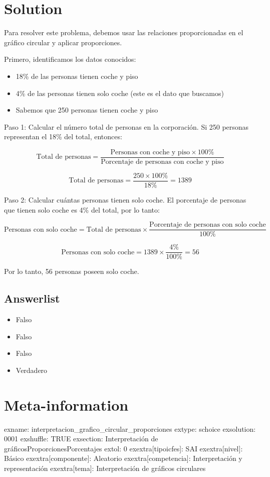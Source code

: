 \documentclass[
]{article}
\providecommand{\tightlist}{%
  \setlength{\itemsep}{0pt}\setlength{\parskip}{0pt}}
\begin{document}
\section{Solution}\label{solution}

Para resolver este problema, debemos usar las relaciones proporcionadas
en el gráfico circular y aplicar proporciones.

Primero, identificamos los datos conocidos:

\begin{itemize}
\tightlist
\item
  18\% de las personas tienen coche y piso
\item
  4\% de las personas tienen solo coche (este es el dato que buscamos)
\item
  Sabemos que 250 personas tienen coche y piso
\end{itemize}

Paso 1: Calcular el número total de personas en la corporación. Si 250
personas representan el 18\% del total, entonces:

\[\text{Total de personas} = \frac{\text{Personas con coche y piso} \times 100\%}{\text{Porcentaje de personas con coche y piso}}\]

\[\text{Total de personas} = \frac{250 \times 100\%}{18\%} = 1389\]

Paso 2: Calcular cuántas personas tienen solo coche. El porcentaje de
personas que tienen solo coche es 4\% del total, por lo tanto:

\[\text{Personas con solo coche} = \text{Total de personas} \times \frac{\text{Porcentaje de personas con solo coche}}{100\%}\]

\[\text{Personas con solo coche} = 1389 \times \frac{4\%}{100\%} = 56\]

Por lo tanto, 56 personas poseen solo coche.

\subsection{Answerlist}\label{answerlist-1}

\begin{itemize}
\tightlist
\item
  Falso
\item
  Falso
\item
  Falso
\item
  Verdadero
\end{itemize}

\section{Meta-information}\label{meta-information}

exname: interpretacion\_grafico\_circular\_proporciones extype: schoice
exsolution: 0001 exshuffle: TRUE exsection: Interpretación de
gráficos\textbar Proporciones\textbar Porcentajes extol: 0
exextra{[}tipoicfes{]}: SAI exextra{[}nivel{]}: Básico
exextra{[}componente{]}: Aleatorio exextra{[}competencia{]}:
Interpretación y representación exextra{[}tema{]}: Interpretación de
gráficos circulares
\end{document}
